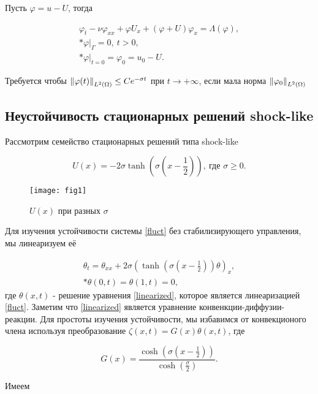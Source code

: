Пусть $\varphi = u - U$, тогда

\begin{gather}\label{fluct}
    \varphi_t - \nu \varphi_{xx} + \varphi U_x + (\varphi + U)\varphi_x =
    \Lambda(\varphi),\\* 
    \varphi|_{\Gamma} = 0, \ t > 0,\\*
    \varphi|_{t = 0} = \varphi_0 = u_0 - U.
\end{gather}

Требуется чтобы $\left\lVert\varphi(t)\right\rVert_{L^2(\Omega)} \le C e^{-\sigma t}$ при $t \to
+\infty$, если мала норма $\left\lVert\varphi_0\right\rVert_{L^2(\Omega)}$

\subsection{Неустойчивость стационарных решений shock-like}

Рассмотрим семейство стационарных решений типа shock-like

\begin{equation}\label{shock_like}
    U(x) = -2\sigma\tanh{(\sigma(x - \frac{1}{2}))}, \ \text{где } \sigma \ge 0.
\end{equation}

\begin{figure}[H]
    \centering
    \texttt{[image: fig1]}
    \caption{$U(x)$ при разных $\sigma$}
\end{figure}

Для изучения устойчивости системы \eqref{fluct} без стабилизирующего управления, 
мы линеаризуем её

\begin{gather}\label{linearized}
    \theta_t = \theta_{xx} + 2 \sigma (\tanh(\sigma(x - \frac{1}{2}))\theta)_x, \\*
    \theta(0, t) = \theta(1, t) = 0,
\end{gather}
где $\theta(x, t)$ - решение уравнения \eqref{linearized}, которое является
линеаризацией \eqref{fluct}. Заметим что \eqref{linearized} является  уравнение 
конвенкции-диффузии-реакции. Для простоты изучения устойчивости, мы избавимся 
от конвекционого члена используя преобразование 
$\zeta(x, t) = G(x)\theta(x, t)$, где 

\begin{equation}
    G(x) = \frac{\cosh(\sigma(x - \frac{1}{2}))}{\cosh(\frac{\sigma}{2})}.
\end{equation} 

Имеем 

